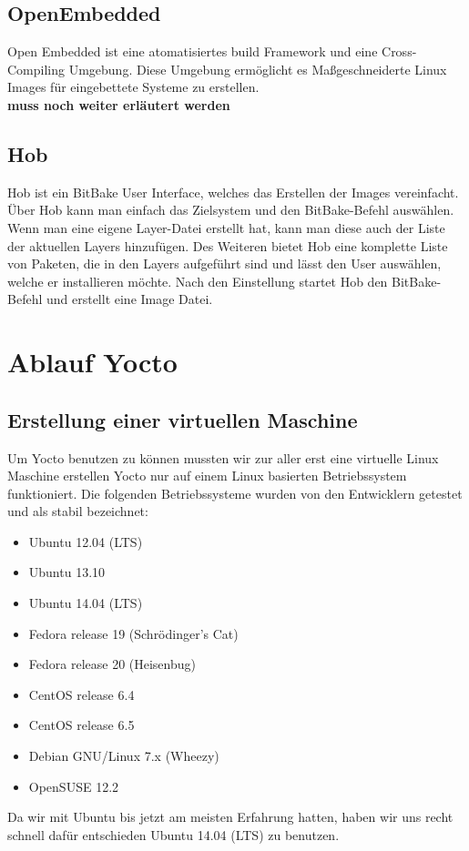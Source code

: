 \documentclass[a4paper,10pt] {article}
\begin{document}
\subsection{OpenEmbedded}
	Open Embedded ist eine atomatisiertes build Framework und eine Cross-Compiling Umgebung. Diese Umgebung ermöglicht es Maßgeschneiderte Linux Images für eingebettete Systeme 
	zu erstellen.
	\\ \textbf {muss noch weiter erläutert werden}
	\newpage

\subsection{Hob}
	Hob ist ein BitBake User Interface, welches das Erstellen der Images vereinfacht. Über Hob kann man einfach das Zielsystem und den BitBake-Befehl auswählen. Wenn man eine eigene
	Layer-Datei erstellt hat, kann man diese auch der Liste der aktuellen Layers hinzufügen. Des Weiteren bietet Hob eine komplette Liste von Paketen, die in den Layers aufgeführt sind 
	und lässt den User auswählen, welche er installieren möchte. Nach den Einstellung startet Hob den BitBake-Befehl und erstellt eine Image Datei.

\section{Ablauf Yocto}
\subsection{Erstellung einer virtuellen Maschine}
Um Yocto benutzen zu können mussten wir zur aller erst eine virtuelle Linux Maschine erstellen Yocto nur auf einem Linux basierten Betriebssystem funktioniert. Die folgenden Betriebssysteme wurden von den Entwicklern getestet und als stabil bezeichnet:
	\begin{itemize}
	\item Ubuntu 12.04 (LTS)
	\item Ubuntu 13.10
	\item Ubuntu 14.04 (LTS)
	\item Fedora release 19 (Schrödinger's Cat)
	\item Fedora release 20 (Heisenbug)
	\item CentOS release 6.4
	\item CentOS release 6.5
	\item Debian GNU/Linux 7.x (Wheezy)
	\item OpenSUSE 12.2
	\end{itemize}
Da wir mit Ubuntu bis jetzt am meisten Erfahrung hatten, haben wir uns recht schnell dafür entschieden Ubuntu 14.04 (LTS) zu benutzen.
\end{document}
